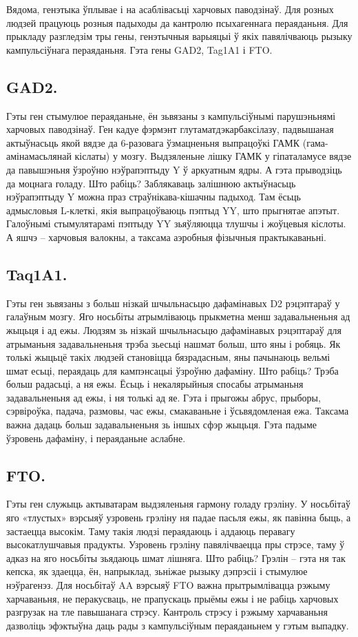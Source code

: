 Вядома, генэтыка ўплывае і на асаблівасьці харчовых паводзінаў. Для розных людзей працуюць розныя падыходы да кантролю псыхагеннага пераяданьня. Для прыкладу разгледзім тры гены, генэтычныя варыяцыі ў якіх павялічваюць рызыку кампульсіўнага пераяданьня. Гэта гены GAD2, Tag1A1 і FTO.

\subsection{GAD2.}
Гэты ген стымулюе пераяданьне, ён зьвязаны з кампульсіўнымі парушэньнямі харчовых паводзінаў. Ген кадуе фэрмэнт глутаматдэкарбаксілазу, падвышаная актыўнасьць якой вядзе да 6-разовага ўзмацненьня выпрацоўкі ГАМК (гама-амінамасьлянай кіслаты) у мозгу. Выдзяленьне лішку ГАМК у гіпаталамусе вядзе да павышэньня ўзроўню нэўрапэптыду Y ў аркуатным ядры. А гэта прыводзіць да моцнага голаду. Што рабіць? Заблякаваць залішнюю актыўнасьць нэўрапэптыду Y можна праз страўнікава-кішачны падыход. Там ёсьць адмысловыя L-клеткі, якія выпрацоўваюць пэптыд YY, што прыгнятае апэтыт. Галоўнымі стымулятарамі пэптыду YY зьяўляюцца тлушчы і жоўцевыя кіслоты. А яшчэ – харчовыя валокны, а таксама аэробныя фізычныя практыкаваньні.

\subsection{Taq1A1.}
Гэты ген зьвязаны з больш нізкай шчыльнасьцю дафамінавых D2 рэцэптараў у галаўным мозгу. Яго носьбіты атрымліваюць прыкметна менш задавальненьня ад жыцьця і ад ежы. Людзям зь нізкай шчыльнасьцю дафамінавых рэцэптараў для атрыманьня задавальненьня трэба зьесьці нашмат больш, што яны і робяць. Як толькі жыцьцё такіх людзей становіцца бязрадасным, яны пачынаюць вельмі шмат есьці, пераядаць для кампэнсацыі ўзроўню дафаміну. Што рабіць? Трэба больш радасьці, а ня ежы. Ёсьць і некалярыйныя спосабы атрыманьня задавальненьня ад ежы, і ня толькі ад яе. Гэта і прыгожы абрус, прыборы, сэрвіроўка, падача, размовы, час ежы, смакаваньне і ўсьвядомленая ежа. Таксама важна дадаць больш задавальненьня зь іншых сфэр жыцьця. Гэта падыме ўзровень дафаміну, і пераяданьне аслабне.

\subsection{FTO.}
Гэты ген служыць актыватарам выдзяленьня гармону голаду грэліну. У носьбітаў яго «тлустых» вэрсыяў узровень грэліну ня падае пасьля ежы, як павінна быць, а застаецца высокім. Таму такія людзі пераядаюць і аддаюць перавагу высокатлушчавыя прадукты. Узровень грэліну павялічваецца пры стрэсе, таму ў адказ на яго носьбіты зьядаюць шмат лішняга. Што рабіць? Грэлін – гэта ня так кепска, як здаецца, ён, напрыклад, зьніжае рызыку дэпрэсіі і стымулюе нэўрагенэз. Для носьбітаў AA вэрсыяў FTO важна прытрымлівацца рэжыму харчаваньня, не перакусваць, не прапускаць прыёмы ежы і не рабіць харчовых разгрузак на тле павышанага стрэсу. Кантроль стрэсу і рэжыму харчаваньня дазволіць эфэктыўна даць рады з кампульсіўным пераяданьнем у гэтым выпадку.

